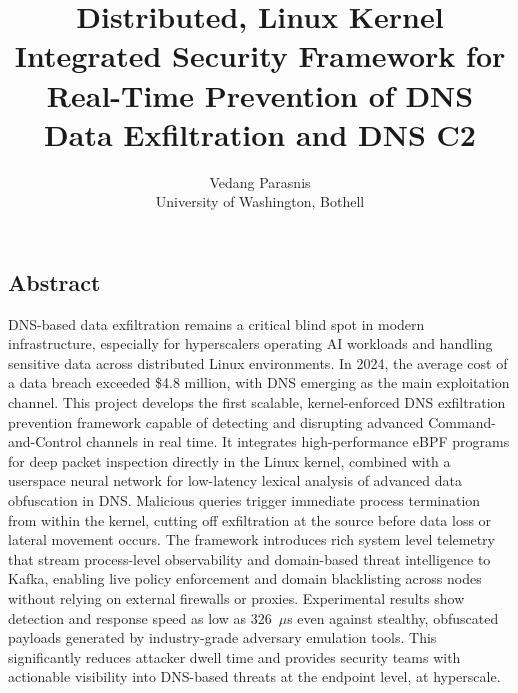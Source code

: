 \documentclass[letterpaper,twocolumn,10pt]{article}
\begin{document}
\date{}

\title{\Large \bf Distributed, Linux Kernel Integrated Security Framework for
Real-Time Prevention of DNS Data Exfiltration and DNS C2}

\author{
{\rm Vedang Parasnis}\\
University of Washington, Bothell
}

\maketitle

\thispagestyle{empty}


\subsection*{Abstract}
DNS-based data exfiltration remains a critical blind spot in modern infrastructure, especially for hyperscalers operating AI workloads and handling sensitive data across distributed Linux environments. In 2024, the average cost of a data breach exceeded \$4.8 million, with DNS emerging as the main exploitation channel.
This project develops the first scalable, kernel-enforced DNS exfiltration prevention framework capable of detecting and disrupting advanced Command-and-Control channels in real time. It integrates high-performance eBPF programs for deep packet inspection directly in the Linux kernel, combined with a userspace neural network for low-latency lexical analysis of advanced data obfuscation in DNS. Malicious queries trigger immediate process termination from within the kernel, cutting off exfiltration at the source before data loss or lateral movement occurs.
The framework introduces rich system level telemetry that stream process-level observability and domain-based threat intelligence to Kafka, enabling live policy enforcement and domain blacklisting across nodes without relying on external firewalls or proxies. Experimental results show detection and response speed as low as 326~$\mu$s even against stealthy, obfuscated payloads generated by industry-grade adversary emulation tools. This significantly reduces attacker dwell time and provides security teams with actionable visibility into DNS-based threats at the endpoint level, at hyperscale.
\end{document}
